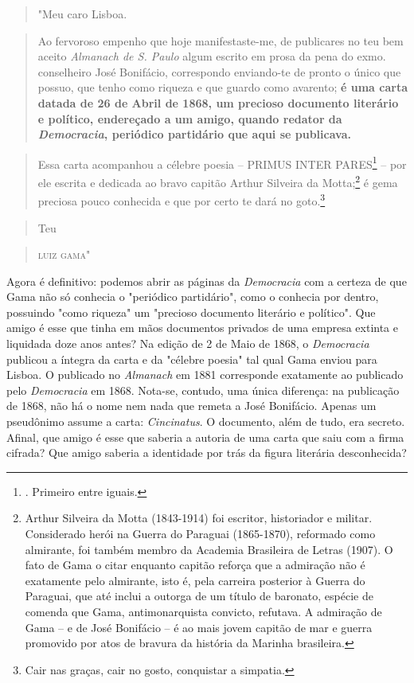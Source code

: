 \begin{quote}
"Meu caro Lisboa.
\end{quote}

\begin{quote}
Ao fervoroso empenho que hoje manifestaste-me, de publicares no teu bem
aceito \emph{Almanach de S. Paulo} algum escrito em prosa da pena do
exmo. conselheiro José Bonifácio, correspondo enviando-te de pronto o
único que possuo, que tenho como riqueza e que guardo como avarento;
\textbf{é uma carta datada de 26 de Abril de 1868, um precioso documento
literário e político, endereçado a um amigo, quando redator da
\emph{Democracia}, periódico partidário que aqui se publicava.}
\end{quote}

\begin{quote}
Essa carta acompanhou a célebre poesia -- PRIMUS INTER PARES\footnote{.
  Primeiro entre iguais.} -- por ele escrita e dedicada ao bravo capitão
Arthur Silveira da Motta;\footnote{Arthur Silveira da Motta (1843-1914)
  foi escritor, historiador e militar. Considerado herói na Guerra do
  Paraguai (1865-1870), reformado como almirante, foi também membro da
  Academia Brasileira de Letras (1907). O fato de Gama o citar enquanto
  capitão reforça que a admiração não é exatamente pelo almirante, isto
  é, pela carreira posterior à Guerra do Paraguai, que até inclui a
  outorga de um título de baronato, espécie de comenda que Gama,
  antimonarquista convicto, refutava. A admiração de Gama -- e de José
  Bonifácio -- é ao mais jovem capitão de mar e guerra promovido por
  atos de bravura da história da Marinha brasileira.} é gema preciosa
pouco conhecida e que por certo te dará no goto.\footnote{Cair nas
  graças, cair no gosto, conquistar a simpatia.}
\end{quote}
\begin{flushright}
\begin{quote}
Teu
\end{quote}

\begin{quote}
\textsc{luiz gama}"
\end{quote}
\end{flushright}
Agora é definitivo: podemos abrir as páginas da \emph{Democracia} com a
certeza de que Gama não só conhecia o "periódico partidário", como o
conhecia por dentro, possuindo "como riqueza" um "precioso documento
literário e político". Que amigo é esse que tinha em mãos documentos
privados de uma empresa extinta e liquidada doze anos antes? Na edição
de 2 de Maio de 1868, o \emph{Democracia} publicou a íntegra da carta e
da "célebre poesia" tal qual Gama enviou para Lisboa. O publicado no
\emph{Almanach} em 1881 corresponde exatamente ao publicado pelo
\emph{Democracia} em 1868. Nota-se, contudo, uma única diferença: na
publicação de 1868, não há o nome nem nada que remeta a José Bonifácio.
Apenas um pseudônimo assume a carta: \emph{Cincinatus}. O documento,
além de tudo, era secreto. Afinal, que amigo é esse que saberia a
autoria de uma carta que saiu com a firma cifrada? Que amigo saberia a
identidade por trás da figura literária desconhecida?

